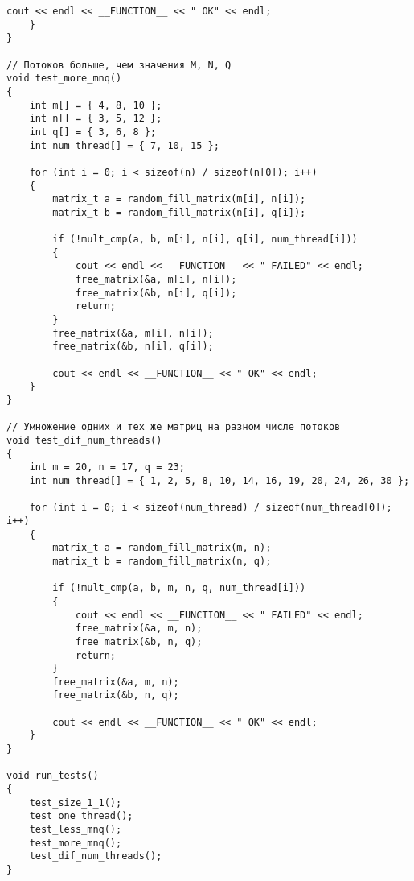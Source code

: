 \begin{lstlisting}[label=code_test, caption = Тесты]
		cout << endl << __FUNCTION__ << " OK" << endl;
	}
}

// Потоков больше, чем значения M, N, Q
void test_more_mnq()
{
	int m[] = { 4, 8, 10 };
	int n[] = { 3, 5, 12 };
	int q[] = { 3, 6, 8 };
	int num_thread[] = { 7, 10, 15 };
	
	for (int i = 0; i < sizeof(n) / sizeof(n[0]); i++)
	{
		matrix_t a = random_fill_matrix(m[i], n[i]);
		matrix_t b = random_fill_matrix(n[i], q[i]);
		
		if (!mult_cmp(a, b, m[i], n[i], q[i], num_thread[i]))
		{
			cout << endl << __FUNCTION__ << " FAILED" << endl;
			free_matrix(&a, m[i], n[i]);
			free_matrix(&b, n[i], q[i]);
			return;
		}
		free_matrix(&a, m[i], n[i]);
		free_matrix(&b, n[i], q[i]);
		
		cout << endl << __FUNCTION__ << " OK" << endl;
	}
}

// Умножение одних и тех же матриц на разном числе потоков
void test_dif_num_threads()
{
	int m = 20, n = 17, q = 23;
	int num_thread[] = { 1, 2, 5, 8, 10, 14, 16, 19, 20, 24, 26, 30 };
	
	for (int i = 0; i < sizeof(num_thread) / sizeof(num_thread[0]); i++)
	{
		matrix_t a = random_fill_matrix(m, n);
		matrix_t b = random_fill_matrix(n, q);
		
		if (!mult_cmp(a, b, m, n, q, num_thread[i]))
		{
			cout << endl << __FUNCTION__ << " FAILED" << endl;
			free_matrix(&a, m, n);
			free_matrix(&b, n, q);
			return;
		}
		free_matrix(&a, m, n);
		free_matrix(&b, n, q);
		
		cout << endl << __FUNCTION__ << " OK" << endl;
	}
}

void run_tests()
{
	test_size_1_1();
	test_one_thread();
	test_less_mnq();
	test_more_mnq();
	test_dif_num_threads();
}
\end{lstlisting}


